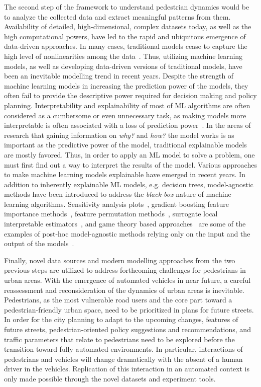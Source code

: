 The second step of the framework to understand pedestrian dynamics would be to analyze the collected data and extract meaningful patterns from them. Availability of detailed, high-dimensional, complex datasets today, as well as the high computational powers, have led to the rapid and ubiquitous emergence of data-driven approaches. In many cases, traditional models cease to capture the high level of nonlinearities among the data~\cite{boulesteix2014machine}. Thus, utilizing machine learning models, as well as developing data-driven versions of traditional models, have been an inevitable modelling trend in recent years. Despite the strength of machine learning models in increasing the prediction power of the models, they often fail to provide the descriptive power required for decision making and policy planning\cite{boulesteix2014machine}. Interpretability and explainability of most of ML algorithms are often considered as a cumbersome or even unnecessary task, as making models more interpretable is often associated with a loss of prediction power~\cite{lipton2016mythos}. In the areas of research that gaining information on \textit{why?} and \textit{how?} the model works is as important as the predictive power of the model, traditional explainable models are mostly favored. Thus, in order to apply an ML model to solve a problem, one must first find out a way to interpret the results of the model. Various approaches to make machine learning models explainable have emerged in recent years. In addition to inherently explainable ML models, e.g. decision trees, model-agnostic methods have been introduced to address the \textit{black-box} nature of machine learning algorithms. Sensitivity analysis plots~\cite{goldstein2015peeking}, gradient boosting feature importance methods~\cite{friedman2001greedy}, feature permutation methods~\cite{fisher2018all}, surrogate local interpretable estimators~\cite{ribeiro2016should}, and game theory based approaches~\cite{vstrumbelj2014explaining,lundberg2017unified} are some of the examples of post-hoc model-agnostic methods relying only on the input and the output of the models~\citep{molnar2019interpretable}.

 
Finally, novel data sources and modern modelling approaches from the two previous steps are utilized to address forthcoming challenges for pedestrians in urban areas. With the emergence of automated vehicles in near future, a careful reassessment and reconsideration of the dynamics of urban areas is inevitable. Pedestrians, as the most vulnerable road users and the core part toward a pedestrian-friendly urban space, need to be prioritized in plans for future streets. In order for the city planning to adapt to the upcoming changes, features of future streets, pedestrian-oriented policy suggestions and recommendations, and traffic parameters that relate to pedestrians need to be explored before the transition toward fully automated environments. In particular, interactions of pedestrians and vehicles will change dramatically with the absent of a human driver in the vehicles. Replication of this interaction in an automated context is only made possible through the novel datasets and experiment tools.      

